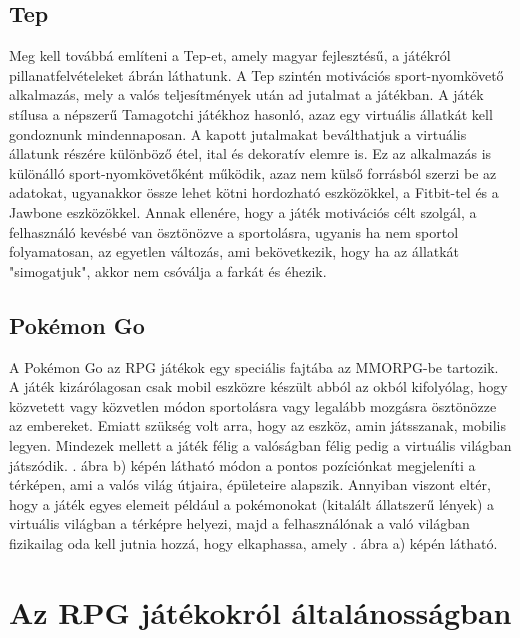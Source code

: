 \subsection{Tep}
\label{tep}
Meg kell továbbá említeni a Tep-et, amely magyar fejlesztésű, a játékról pillanatfelvételeket  ábrán láthatunk. 
A Tep szintén motivációs sport-nyomkövető alkalmazás, mely a valós teljesítmények után ad jutalmat a játékban. 
A játék stílusa a népszerű Tamagotchi játékhoz hasonló, azaz egy virtuális állatkát kell gondoznunk mindennaposan. 
A kapott jutalmakat beválthatjuk a virtuális állatunk részére különböző étel, ital és dekoratív elemre is. 
Ez az alkalmazás is különálló sport-nyomkövetőként működik, azaz nem külső forrásból szerzi be az adatokat, ugyanakkor össze lehet kötni hordozható eszközökkel, a Fitbit-tel és a Jawbone eszközökkel. 
Annak ellenére, hogy a játék motivációs célt szolgál, a felhasználó kevésbé van ösztönözve a sportolásra, ugyanis ha nem sportol folyamatosan, az egyetlen változás, ami bekövetkezik, hogy ha az állatkát "simogatjuk", akkor nem csóválja a farkát és éhezik. 

\subsection{Pokémon Go}
\label{pokemongo}
A Pokémon Go az RPG játékok egy speciális fajtába az MMORPG-be tartozik. 
A játék kizárólagosan csak mobil eszközre készült abból az okból kifolyólag, hogy közvetett vagy közvetlen módon sportolásra vagy legalább mozgásra ösztönözze az embereket. 
Emiatt szükség volt arra, hogy az eszköz, amin játsszanak, mobilis legyen. 
Mindezek mellett a játék félig a valóságban félig pedig a virtuális világban játszódik. 
. ábra b) képén látható módon a pontos pozíciónkat megjeleníti a térképen, ami a valós világ útjaira, épületeire alapszik. 
Annyiban viszont eltér, hogy a játék egyes elemeit például a pokémonokat (kitalált állatszerű lények) a virtuális világban a térképre helyezi, majd a felhasználónak a való világban fizikailag oda kell jutnia hozzá, hogy elkaphassa, amely . ábra a) képén látható. 

\section{Az RPG játékokról általánosságban}
\label{rpgaltalanos}

